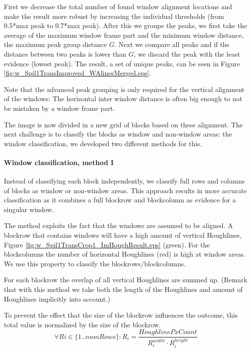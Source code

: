 First we decrease the total number of found window alignment locations and make 
the result more robust by increasing the individual thresholds (from 0.5*max
peak to 0.7*max peak). 
After this we groupe the peaks, we first take the average of the maximum window frame part and the minimum window
distance, the maximum peak group distance $G$.
Next we compare all peaks and if the distance between two peaks is lower than
$G$, we discard the peak with the least evidence (lowest peak). The result,
a set of unique peaks, can be seen in Figure \ref{fig:w_Spil1TransImproved_WAlinesMerged.eps}.

Note that the advanced peak grouping is only required for the vertical alignment
of the windows: The horizontal inter window distance is often big enough to not
be mistaken by a window frame part.

The image is now divided in a new grid of blocks based on these
alignment. The next challenge is to classify the blocks as window and
non-window areas: the window classification, we developed two different methods for this.


\paragraph{Window classification, method I}
Instead of classifying each block independently, we classify full rows and
columns of blocks as window or non-window areas.  This approach results in more accurate
classification as it combines a full blockrow and blockcolumn as evidence for a singular
window. 

The method exploits the fact that the windows are assumed to be
aligned.
A blockrow that contains windows will have a high amount of vertical
Houghlines, Figure \ref{fig:w_Spil1TransCrop1_ImHoughResult.eps}
(green). For the blockcolumns the number of horizontal Houghlines
 (red) is high at window areas.  We use this property to classify 
 the blockrows/blockcolumns. 

For each blockrow the overlap of all vertical Houghlines are summed up.
(Remark that with this method we take both the length of the Houghlines and
amount of Houghlines implicitly into account.)

To prevent the effect that the size of the blockrow influences the outcome, this total value
is normalized by the size of the blockrow.
\[\forall Ri\in \{1..numRows\} : R_i = \frac{HoughlinePxCount}{R_i^{width} \cdot R_i^{height}}\]

